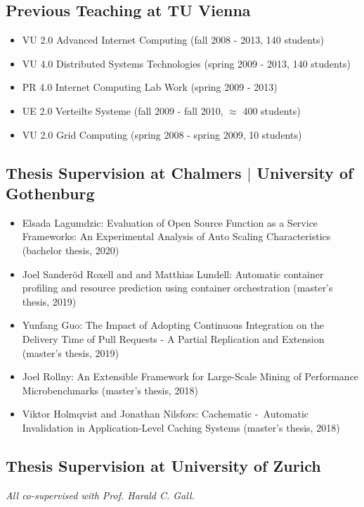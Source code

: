 \documentclass[paper=letter,fontsize=11pt]{scrartcl} %
\begin{document}
\subsection*{Previous Teaching at TU Vienna}
\begin{itemize}
  \item VU 2.0 Advanced Internet Computing (fall 2008 - 2013, 140 students)
  \item VU 4.0 Distributed Systems Technologies (spring 2009 - 2013, 140 students)
  \item PR 4.0 Internet Computing Lab Work (spring 2009 - 2013)
  \item UE 2.0 Verteilte Systeme (fall 2009 - fall 2010, $\approx$ 400 students)
  \item VU 2.0 Grid Computing (spring 2008 - spring 2009, 10 students)
\end{itemize}

\subsection*{Thesis Supervision at Chalmers $|$ University of Gothenburg}

\begin{itemize}
	\item Elsada Lagumdzic: Evaluation of Open Source Function as a Service Frameworks: An Experimental Analysis of Auto Scaling Characteristics (bachelor thesis, 2020)
	\item Joel Sanderöd Roxell and and Matthias Lundell: Automatic container profiling
and resource prediction using container orchestration (master's thesis, 2019)
	\item Yunfang Guo: The Impact of Adopting Continuous Integration on the Delivery Time of Pull Requests - A Partial Replication and Extension (master's thesis, 2019)
	\item Joel Rollny: An Extensible Framework for Large-Scale Mining of Performance Microbenchmarks (master's thesis, 2018)
  \item Viktor Holmqvist and Jonathan Nilsfors: Cachematic - Automatic Invalidation in Application-Level Caching Systems (master's thesis, 2018)
\end{itemize}

\subsection*{Thesis Supervision at University of Zurich}

\emph{All co-supervised with Prof. Harald C. Gall.}
\end{document}
